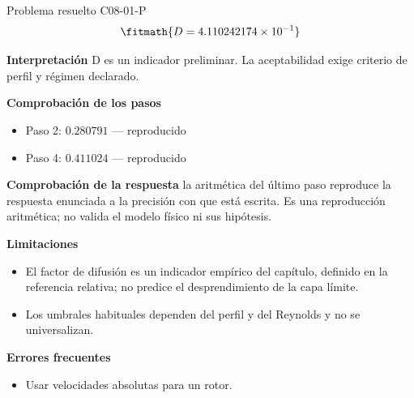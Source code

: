 \documentclass[10pt,openany]{book}
\begin{document}
\begin{studiumworked}{Problema resuelto C08-01-P}
\[
\fitmath{D=4.110242174\times10^{-1}}
\]

\noindent\textbf{Interpretación}
D es un indicador preliminar. La aceptabilidad exige criterio de perfil y régimen declarado.

\noindent\textbf{Comprobación de los pasos}
\begin{itemize}
\item Paso 2: $0.280791$ — reproducido
\item Paso 4: $0.411024$ — reproducido
\end{itemize}

\noindent\textbf{Comprobación de la respuesta} la aritmética del último paso reproduce la respuesta enunciada a la precisión con que está escrita. Es una reproducción aritmética; no valida el modelo físico ni sus hipótesis.

\noindent\textbf{Limitaciones}
\begin{itemize}
\item El factor de difusión es un indicador empírico del capítulo, definido en la referencia relativa; no predice el desprendimiento de la capa límite.
\item Los umbrales habituales dependen del perfil y del Reynolds y no se universalizan.
\end{itemize}

\noindent\textbf{Errores frecuentes}
\begin{itemize}
\item Usar velocidades absolutas para un rotor.
\end{itemize}
\end{studiumworked}
\end{document}
